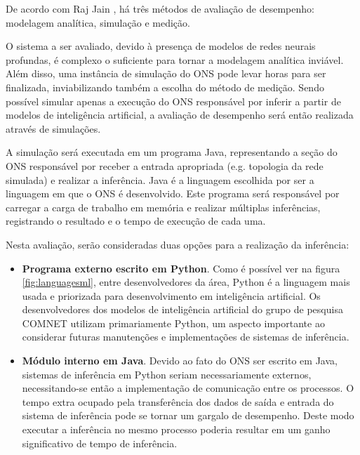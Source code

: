 De acordo com Raj Jain \cite{jain1991art}, há três métodos de avaliação de desempenho: modelagem analítica, simulação e medição.

O sistema a ser avaliado, devido à presença de modelos de redes neurais profundas, é complexo o suficiente para tornar a modelagem analítica inviável. Além disso, uma instância de simulação do ONS pode levar horas para ser finalizada, inviabilizando também a escolha do método de medição. Sendo possível simular apenas a execução do ONS responsável por inferir a partir de modelos de inteligência artificial, a avaliação de desempenho será então realizada através de simulações.

A simulação será executada em um programa Java, representando a seção do ONS responsável por receber a entrada apropriada (e.g. topologia da rede simulada) e realizar a inferência. Java é a linguagem escolhida por ser a linguagem em que o ONS é desenvolvido. Este programa será responsável por carregar a carga de trabalho em memória e realizar múltiplas inferências, registrando o resultado e o tempo de execução de cada uma.

Nesta avaliação, serão consideradas duas opções para a realização da inferência:

\begin{itemize}
  \item \textbf{Programa externo escrito em Python}. Como é possível ver na figura \ref{fig:languagesml}, entre desenvolvedores da área, Python é a linguagem mais usada e priorizada para desenvolvimento em inteligência artificial. Os desenvolvedores dos modelos de inteligência artificial do grupo de pesquisa COMNET utilizam primariamente Python, um aspecto importante ao considerar futuras manutenções e implementações de sistemas de inferência.
  \item \textbf{Módulo interno em Java}. Devido ao fato do ONS ser escrito em Java, sistemas de inferência em Python seriam necessariamente externos, necessitando-se então a implementação de comunicação entre os processos. O tempo extra ocupado pela transferência dos dados de saída e entrada do sistema de inferência pode se tornar um gargalo de desempenho. Deste modo executar a inferência no mesmo processo poderia resultar em um ganho significativo de tempo de inferência.
\end{itemize}

